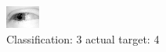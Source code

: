 \begin{figure}[h!]
\begin{center}
\includegraphics[width=0.60\columnwidth]{figures/ID2494_class_3_target_4.png}
\end{center}
\caption{ Classification: 3 actual target: 4}
\label{fig:ID2494_class_3_target_4}
\end{figure}
